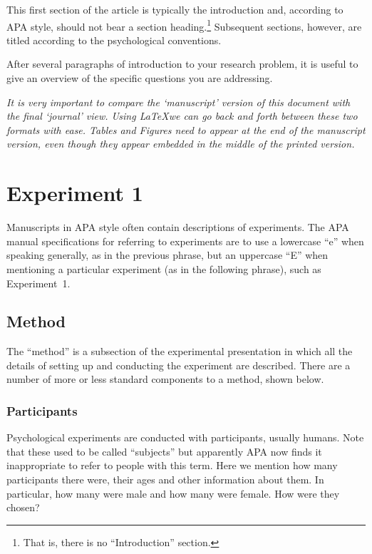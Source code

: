\documentclass[jou]{apa}%
\begin{document}

This first section of the article is typically the introduction and, according to APA style, should not bear a section heading.\footnote{That is, there is no ``Introduction'' section.} Subsequent sections, however, are titled according to the psychological conventions. %

After several paragraphs of introduction to your research problem, it is useful  to give an overview of the specific questions you are addressing.  

\emph{It is very important to compare the `manuscript' version of this document with the final `journal' view.  Using \LaTeX we can go back and forth between these two formats with ease.  Tables and Figures need to appear at the end of the manuscript version, even though they appear embedded in the middle of the printed version.  }

\section{Experiment 1} 
Manuscripts in APA style often contain descriptions of experiments.  The APA manual specifications for referring to experiments are to use a lowercase ``e'' when speaking generally, as in the previous phrase, but an uppercase ``E'' when mentioning a particular experiment (as in the following phrase), such as Experiment~1.  %

\subsection{Method}
The ``method'' is a subsection of the experimental presentation in which all the details of setting up and conducting the experiment are described.  There are a number of more or less standard components to a method, shown below.  %

%
\subsubsection{Participants}
Psychological experiments are conducted with participants, usually humans. Note that these used to be called ``subjects'' but apparently APA now finds it inappropriate to refer to people with this term.  Here we mention how many participants there were, their ages and other information about them.  In particular, how many were male and how many were female.  How were they chosen? %
\end{document}
